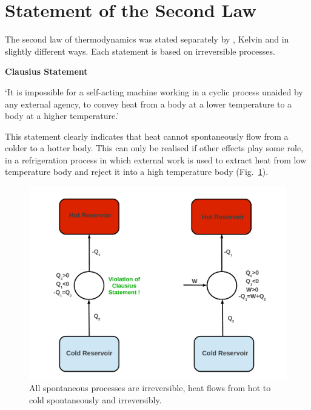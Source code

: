    \section{Statement of the Second Law}\label{Chapter:SecondLaw:Section:SecondLawStatement}
The second law of thermodynamics was stated separately by \citet{Clausius_Book}, Kelvin \citep{Thomson_1851} and \citet{Planck_Book} in slightly different ways. Each statement is based on irreversible processes.
\begin{shaded}
  \begin{center} {\bf Clausius Statement} \end{center}
  `It is impossible for a self-acting machine working in a cyclic process unaided by any external agency, to convey heat from a body at a lower temperature to a body at a higher temperature.'
\end{shaded}
This statement clearly indicates that heat cannot spontaneously flow from a colder to a hotter body. This can only be realised if other effects play some role, \eg in a refrigeration process in which external work is used to extract heat from low temperature body and reject it into a high temperature body (Fig.~\ref{Chapter:SecondLaw:Fig:SecondLawStatement}).

   \begin{figure}[h]
     \begin{center}
        \includegraphics[width=.8\columnwidth,clip]{./Figs/2ndLaw_Schem}
     \caption{All spontaneous processes are irreversible, \ie heat flows from hot to cold spontaneously and irreversibly. }\label{Chapter:SecondLaw:Fig:SecondLawStatement}
     \end{center}
   \end{figure} 


